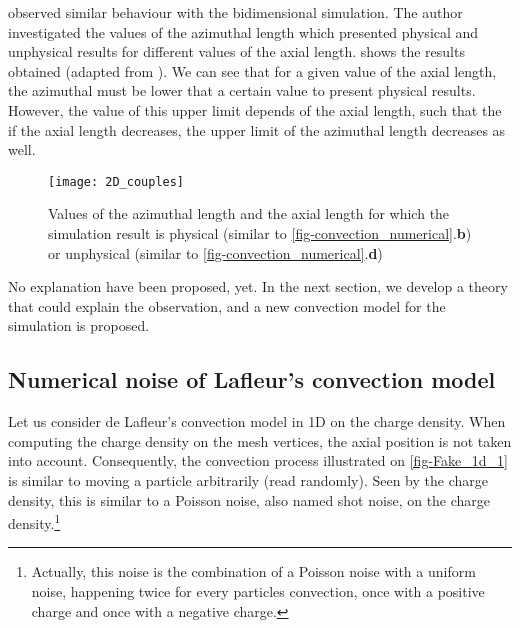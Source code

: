    \FloatBarrier
    \citet{croes2017} observed similar behaviour with the bidimensional  simulation.
    The author investigated the values of the azimuthal length which presented physical and unphysical results
    for different values of the axial length.
     shows the results obtained (adapted from \citep{croes2017}).
    We can see that for a given value of the axial length, the azimuthal must be lower that a certain value to present physical results.
    However, the value of this upper limit depends of the axial length, such that the if the axial length decreases, the upper limit of the azimuthal length decreases as well.

    \begin{figure}[hbtp]
      \centering
      \texttt{[image: 2D\_couples]}
      \caption{Values of the azimuthal length and the axial length for which the simulation result is physical (similar to \cref{fig-convection_numerical}.{\bf b}) or unphysical  (similar to \cref{fig-convection_numerical}.{\bf d}) }
      \label{fig-couplesCroes}
    \end{figure}

    No explanation have been proposed, yet.
    In the next section, we develop a theory that could explain the observation, and a new convection model for the simulation is proposed.

  \subsection{Numerical noise of Lafleur's convection model}

    Let us consider de Lafleur's convection model in \ac{1D} on the charge density.
    When computing the charge density on the mesh vertices, the axial position is not taken into account.
    Consequently, the convection process illustrated on \cref{fig-Fake_1d_1} is similar to moving a particle arbitrarily (read randomly).
    Seen by the charge density, this is similar to a Poisson noise, also named shot noise, on the charge density.\footnote{Actually, this noise is the combination of a Poisson noise with a uniform noise, happening twice for every particles convection, once with a positive charge and once with a negative charge.}

